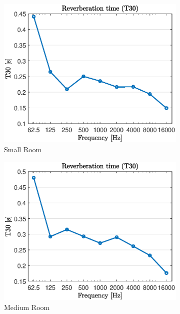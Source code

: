 \documentclass[a4paper,twoside,12pt,hidelinks]{article}
\begin{document}
\begin{figure}[H]
\centering	
\begin{subfigure}[H]{0.3\textwidth}
\includegraphics[width=\textwidth]{t30s}
\caption{Small Room}
\end{subfigure}
\begin{subfigure}[H]{0.3\textwidth}
\includegraphics[width=\textwidth]{t30m}
\caption{Medium Room}
\end{subfigure}
\begin{subfigure}[H]{0.3\textwidth}

\end{subfigure}
\end{figure}
\end{document}
